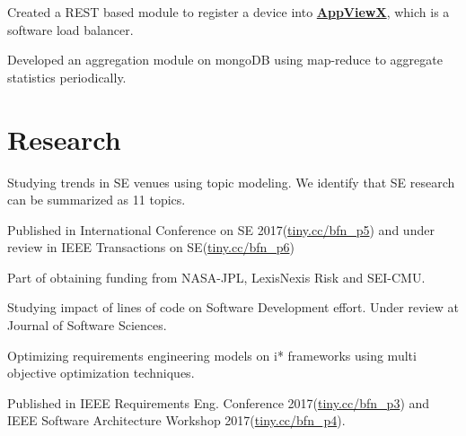 \documentclass[]{bigfatnoob-resume}
\begin{document}
\begin{minipage}[t]{0.66\textwidth}
\begin{tightemize}
\item Created a REST based module to register a device into \textbf{\href{http://www.appviewx.com/}{AppViewX}}, which is a software load balancer.
\item Developed an aggregation module on mongoDB using map-reduce to aggregate statistics periodically.
\end{tightemize}
\sectionsep


\section{Research}
\begin{tightemize}
\item Studying trends in SE venues using topic modeling. We identify that SE research can be summarized as 11 topics. 
\item Published in International Conference on SE 2017(\href{https://tiny.cc/bfn_p5}{tiny.cc/bfn\_p5}) and under review in IEEE Transactions on SE(\href{https://tiny.cc/bfn_p6}{tiny.cc/bfn\_p6})
\item Part of obtaining funding from NASA-JPL, LexisNexis Risk and SEI-CMU.
\item Studying impact of lines of code on Software Development effort. Under review at Journal of Software Sciences.
\end{tightemize}
\sectionsep


\begin{tightemize}
\item Optimizing requirements engineering models on i* frameworks using multi objective optimization techniques.
\item Published in IEEE Requirements Eng. Conference 2017(\href{https://tiny.cc/bfn_p3}{tiny.cc/bfn\_p3}) and\\ IEEE Software Architecture Workshop 2017(\href{https://tiny.cc/bfn\_p4}{tiny.cc/bfn\_p4}).
\end{tightemize}
\sectionsep


\end{minipage}
\end{document}

